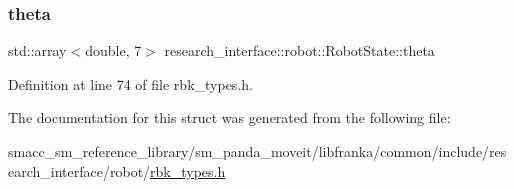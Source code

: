 \subsubsection{\texorpdfstring{theta}{theta}}
{\footnotesize\ttfamily std\+::array$<$double, 7$>$ research\+\_\+interface\+::robot\+::\+Robot\+State\+::theta}



Definition at line 74 of file rbk\+\_\+types.\+h.



The documentation for this struct was generated from the following file\+:\begin{DoxyCompactItemize}
\item 
smacc\+\_\+sm\+\_\+reference\+\_\+library/sm\+\_\+panda\+\_\+moveit/libfranka/common/include/research\+\_\+interface/robot/\hyperlink{rbk__types_8h}{rbk\+\_\+types.\+h}\end{DoxyCompactItemize}
